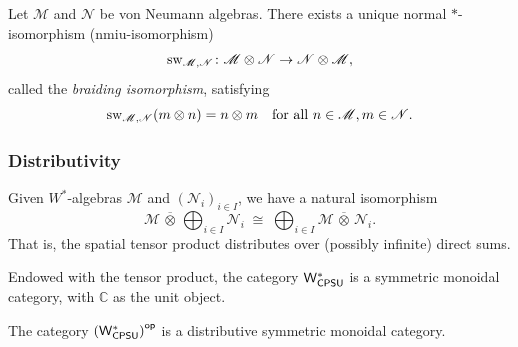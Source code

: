 \begin{proposition} \cite[Exercise 119 IVc]{westerbaanCategoryNeumannAlgebras2019} \label{prop:swap_nmiu}
  Let $\mathscr{M}$ and $\mathscr{N}$ be von Neumann algebras.
There exists a unique normal $\ast$-isomorphism (nmiu-isomorphism)
\[
    \mathrm{sw}_{\mathscr{M},\mathscr{N}} \colon \mathscr{M} \otimes \mathscr{N} \to \mathscr{N} \otimes \mathscr{M},
    \]
    called the \emph{braiding isomorphism}, satisfying
    \[
    \mathrm{sw}_{\mathscr{M},\mathscr{N}}(m \otimes n) = n \otimes m \quad \text{for all } n \in \mathscr{M}, m \in \mathscr{N}.
    \]
\end{proposition}


\subsubsection{Distributivity}

\begin{proposition}\cite[Proposition 117 III] {westerbaanCategoryNeumannAlgebras2019} \label{prop:w*_product_disct_tensor}
  Given $W^*$-algebras \( \mathscr{M} \) and \( (\mathscr{N}_i)_{i \in I} \), we have a natural isomorphism
\[
\mathscr{M}  \,\overline{\otimes}\, \bigoplus_{i \in I} \mathscr{N}_i \;\cong\; \bigoplus_{i \in I} \mathscr{M}  \,\overline{\otimes}\, \mathscr{N}_i.
\]
That is, the spatial tensor product distributes over (possibly infinite) direct sums.
\end{proposition}

\begin{theorem} \cite[Theorem 119 V]{westerbaanCategoryNeumannAlgebras2019} \label{thm:wcpsu_monoidal}
Endowed with the tensor product, the category $\mathsf{W^*_{CPSU}}$  is a symmetric monoidal category, with \( \mathbb{C} \) as the unit object.
\end{theorem}

\begin{theorem}
The category $\left(\mathsf{W^*_{CPSU}}\right)^{\mathsf{op}}$ is a distributive symmetric monoidal category.
\end{theorem}

